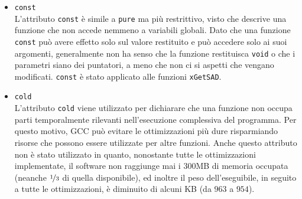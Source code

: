 \begin{itemize}
	\item\verb|const|\\
	L'attributo \verb|const| è simile a \verb|pure| ma più restrittivo, visto 
	che descrive una funzione che non accede nemmeno a variabili globali.
	Dato che una funzione \verb|const| può avere effetto solo sul valore 
	restituito e può accedere solo ai suoi argomenti, generalmente non ha senso 
	che la funzione restituisca \verb|void| o che i parametri siano dei 
	puntatori, a meno che non ci si aspetti che vengano modificati. 
	\verb|const| è stato applicato alle funzioni \verb|xGetSAD|.
	
	\item\verb|cold|\\
	L'attributo \verb|cold| viene utilizzato per dichiarare che una funzione 
	non occupa parti temporalmente rilevanti nell'esecuzione complessiva del 
	programma. Per questo motivo, GCC può evitare le ottimizzazioni più dure 
	risparmiando risorse che possono essere utilizzate per altre funzioni. 
	Anche questo attributo non è stato utilizzato in quanto, nonostante tutte 
	le ottimizzazioni implementate, il software non raggiunge mai i $300$MB di 
	memoria occupata (neanche $\nicefrac{1}{3}$ di quella disponibile), ed 
	inoltre il peso dell'eseguibile, in seguito a tutte le ottimizzazioni, è 
	diminuito di alcuni KB (da $963$ a $954$).
\end{itemize}

